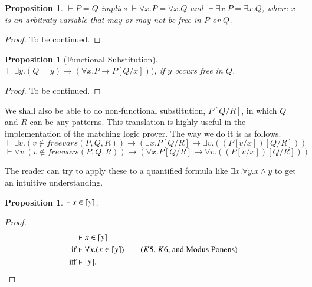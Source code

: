 \documentclass{article}
\theoremstyle{plain}
\newtheorem{prop}[thm]{Proposition}
\DeclarePairedDelimiter\ceil{\lceil}{\rceil}
\def\fv{\textit{freevars}}
\begin{document}
\begin{prop}
	$\vdash P=Q$ implies $\vdash \forall x . P = \forall x . Q$ and $\vdash \exists x . P = \exists x . Q$, where $x$ is an arbitraty variable that may or may not be free in $P$ or $Q$.
\end{prop}
\begin{proof}
	To be continued.
\end{proof}


\begin{prop}[Functional Substitution]
$\vdash \exists y . (Q = y) \to (\forall x . P \to P[Q/x]))$, if $y$ occurs free in $Q$.
\end{prop}

\begin{proof}
	To be continued.
\end{proof}

We shall also be able to do non-functional substitution, $P[Q/R]$, in which $Q$ and $R$ can be any patterns. This translation is highly useful in the implementation of the matching logic prover. The way we do it is as follows. 
$$\vdash \exists v.( v \notin \fv(P, Q, R )) \to (\exists x. P[Q/R] \to \exists v.((P[v/x])[Q/R] )) $$
$$\vdash \forall v.( v \notin \fv(P, Q, R )) \to (\forall x. P[Q/R] \to \forall v.((P[v/x])[Q/R] )) $$

The reader can try to apply these to a quantified formula like $\exists x. \forall y. x \wedge y$ to get an intuitive understanding.

\begin{prop} \label{prop:var1}
$\vdash x \in \ceil*{y}$.
\end{prop}
\begin{proof}
\begin{align*}
&\vdash x \in \ceil*{y} \\
{\text{if}}& \vdash \forall x . (x \in \ceil*{y}) \tag{$K5$, $K6$, and Modus Ponens} \\
{\text{iff}}& \vdash \ceil*{y}.
\end{align*}
\end{proof}
\end{document}
